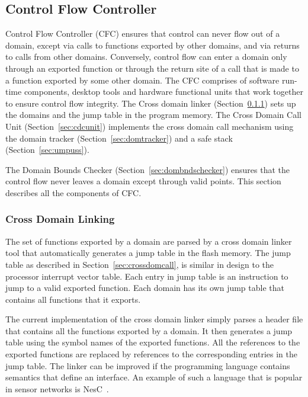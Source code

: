 \subsection{Control Flow Controller}
\label{sec:cfctrl}
%
Control Flow Controller (CFC) ensures that control can never flow out of
a domain, except via calls to functions exported by other domains, and
via returns to calls from other domains.
%
Conversely, control flow can enter a domain only through an exported
function or through the return site of a call that is made to a
function exported by some other domain.
%
%
The CFC comprises of software run-time components, desktop tools and hardware functional units that work together to ensure control flow integrity.
%
The Cross domain linker (Section~\ref{sec:cross_domain_linking}) sets up the domains and the jump table in the program memory.
%
The Cross Domain Call Unit (Section~\ref{sec:cdcunit}) implements the
cross domain call mechanism using the domain tracker
(Section~\ref{sec:domtracker}) and a safe stack
(Section~\ref{sec:umpuss}).

%
The Domain Bounds Checker (Section~\ref{sec:dombndschecker}) ensures that the control flow never leaves a domain except through valid points.
%
This section describes all the components of CFC.
\subsubsection{Cross Domain Linking}
\label{sec:cross_domain_linking}
%
The set of functions exported by a domain are parsed by a cross domain
linker tool that automatically generates a jump table in the
flash memory.
%
The jump table as described in Section~\ref{sec:crossdomcall}, is
similar in design to the processor interrupt vector table.
%
Each entry in jump table is an instruction to jump to a valid exported
function.
%
Each domain has its own jump table that contains all functions that it
exports. 

The current implementation of the cross domain linker simply parses a
header file that contains all the functions exported by a domain.
%
It then generates a jump table using the symbol names of the exported
functions.
%
All the references to the exported functions are replaced by references to
the corresponding entries in the jump table.
%
The linker can be improved if the programming language contains
semantics that define an interface.
%
An example of such a language that is popular in sensor networks is
NesC~\cite{gay03nesc}.
